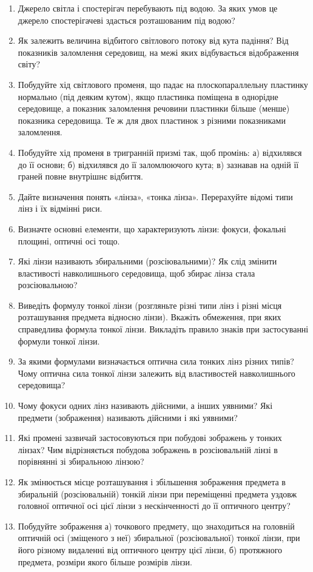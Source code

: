 \documentclass[12pt]{article}
\begin{document}
\begin{enumerate}[label*=\bfseries\color{red!60!black}\arabic*.,ref=\arabic*, wide,leftmargin=*]
\item Джерело світла і спостерігач перебувають під водою. За яких умов це джерело спостерігачеві здасться розташованим під водою?
\item Як залежить величина відбитого світлового потоку від кута падіння? Від показників заломлення середовищ, на межі яких відбувається відображення світу?
\item Побудуйте хід світлового променя, що падає на плоскопараллельну пластинку нормально (під деяким кутом), якщо пластинка поміщена в однорідне середовище, а показник заломлення речовини пластинки більше (менше) показника середовища. Те ж для двох пластинок з різними показниками заломлення.
\item Побудуйте хід променя в тригранній призмі так, щоб промінь: а) відхилявся до її основи; б) відхилявся до її заломлюючого кута; в) зазнавав на одній її граней повне внутрішнє відбиття.
\item Дайте визначення понять «лінза», «тонка лінза». Перерахуйте відомі типи лінз і їх відмінні риси.
\item Визначте основні елементи, що характеризують лінзи: фокуси, фокальні площині, оптичні осі тощо.
\item Які лінзи називають збиральними (розсіювальними)? Як слід змінити властивості навколишнього середовища, щоб збирає лінза стала розсіювальною?
\item Виведіть формулу тонкої лінзи (розгляньте різні типи лінз і різні місця розташування предмета відносно лінзи). Вкажіть обмеження, при яких справедлива формула тонкої лінзи. Викладіть правило знаків при застосуванні формули тонкої лінзи.
\item За якими формулами визначається оптична сила тонких лінз різних типів? Чому оптична сила тонкої лінзи залежить від властивостей навколишнього середовища?
\item Чому фокуси одних лінз називають дійсними, а інших уявними? Які предмети (зображення) називають дійсними і які уявними?
\item Які промені зазвичай застосовуються при побудові зображень у тонких лінзах? Чим відрізняється побудова зображень в розсіювальній лінзі в порівнянні зі збиральною лінзою?
\item Як змінюється місце розташування і збільшення зображення предмета в збиральній (розсіювальній) тонкій лінзи при переміщенні предмета уздовж головної оптичної осі цієї лінзи з нескінченності до її оптичного центру?
\item Побудуйте зображення а) точкового предмету, що знаходиться на головній оптичній осі (зміщеного з неї) збиральної (розсіювальної) тонкої лінзи, при його різному видаленні від оптичного центру цієї лінзи, б) протяжного предмета, розміри якого більше розмірів лінзи.

\end{enumerate}
\end{document}
